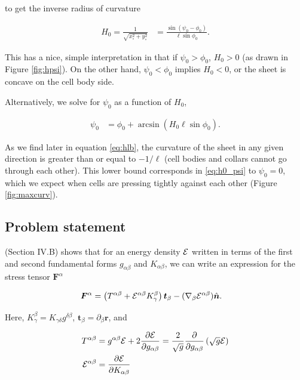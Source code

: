 \noindent to get the inverse radius of curvature 

\begin{align}
    H_0 = \frac{1}{\sqrt{x_\circ^2 + y_\circ^2}} &= \frac{\sin(\psi_0 - \phi_0)}{\ell \sin\phi_0}. \label{eq:H0_phipsi}
\end{align}

This has a nice, simple interpretation in that if $\psi_0 > \phi_0$, $H_0 > 0$ (as drawn in Figure \ref{fig:hpsi}). On the other hand, $\psi_0 < \phi_0$ implies $H_0 < 0$, or the sheet is concave on the cell body side. 

Alternatively, we solve for $\psi_0$ as a function of $H_0$,

\begin{align}
    \psi_0 &= \phi_0 + \arcsin \left( H_0 \ell \sin \phi_0 \right). \label{eq:h0_psi}
\end{align}

As we find later in equation \ref{eq:hlb}, the curvature of the sheet in any given direction is greater than or equal to $-1/\ell$ (cell bodies and collars cannot go through each other). This lower bound corresponds in \ref{eq:h0_psi} to $\psi_0 = 0$, which we expect when cells are pressing tightly against each other (Figure \ref{fig:maxcurv}).


\subsection{Problem statement} \label{subsec:problem}

\citet{powers2010} (Section IV.B) shows that for an energy density $\mathcal{E}$ written in terms of the first and second fundamental forms $g_{\alpha\beta}$ and $K_{\alpha\beta}$, we can write an expression for the stress tensor $\bm{F}^\alpha$ 

\begin{align}
    \bm{F}^\alpha &= \left(T^{\alpha\beta} + \mathcal{E}^{\alpha\beta}K_\gamma^\beta \right)\bm{t}_\beta - (\nabla_\beta \mathcal{E}^{\alpha\beta})\hat{\bm{n}}. \label{eq:stress}
\end{align}

\noindent Here, $K_\gamma^\beta = K_{\gamma \delta}g^{\delta \beta}$, $\bm{t}_\beta = \partial_\beta \bm{r}$, and 

\begin{align*}
    T^{\alpha\beta} &= g^{\alpha\beta} \mathcal{E} + 2 \frac{\partial \mathcal{E}}{\partial g_{\alpha\beta}} = \frac{2}{\sqrt{g}} \frac{\partial}{\partial g_{\alpha\beta}} \left(\sqrt{g}\mathcal{E} \right) \\
    \mathcal{E}^{\alpha\beta} &= \frac{\partial \mathcal{E}}{\partial K_{\alpha\beta}}
\end{align*}

